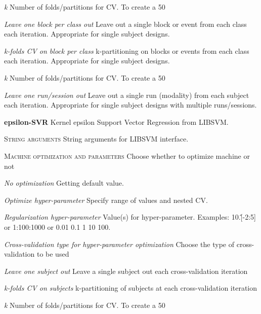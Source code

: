 \textit{k}
Number of folds/partitions for CV. To create a 50%


\textit{Leave one block per class out}
Leave out a single block or event from each class each iteration. Appropriate for single subject designs.


\textit{k-folds CV on block per class}
k-partitioning on blocks or events from each class each iteration. Appropriate for single subject designs.


\textit{k}
Number of folds/partitions for CV. To create a 50%


\textit{Leave one run/session out}
Leave out a single run (modality) from each subject each iteration. Appropriate for single subject designs with multiple runs/sessions.


\textbf{epsilon-SVR}
Kernel epsilon Support Vector Regression from LIBSVM.


\textsc{String arguments}
String arguments for LIBSVM interface.


\textsc{Machine optimization and parameters}
Choose whether to optimize machine or not


\textsl{No optimization}
Getting default value.


\textsl{Optimize hyper-parameter}
Specify range of values and nested CV.


\textit{Regularization hyper-parameter}
Value(s) for hyper-parameter. Examples: 10.\^[-2:5] or 1:100:1000 or 0.01 0.1 1 10 100.


\textit{Cross-validation type for hyper-parameter optimization}
Choose the type of cross-validation to be used


\textit{Leave one subject out}
Leave a single subject out each cross-validation iteration


\textit{k-folds CV on subjects}
k-partitioning of subjects at each cross-validation iteration


\textit{k}
Number of folds/partitions for CV. To create a 50%


